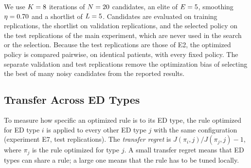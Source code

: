 We use $K=8$ iterations of $N=20$ candidates, an elite of $E=5$, smoothing $\eta=0.70$ and a shortlist of $L=5$. Candidates are evaluated on \NTrainReps{} training replications, the shortlist on \NValReps{} validation replications, and the selected policy on the \Reps{} test replications of the main experiment, which are never used in the search or the selection. Because the test replications are those of E2, the optimized policy is compared pairwise, on identical patients, with every fixed policy. The separate validation and test replications remove the optimization bias of selecting the best of many noisy candidates from the reported results.

\subsection{Transfer Across ED Types}

To measure how specific an optimized rule is to its ED type, the rule optimized for ED type $i$ is applied to every other ED type $j$ with the same configuration (experiment E7, \NTransferReps{} test replications). The \emph{transfer regret} is $J(\pi_i,j)/J(\pi_j,j)-1$, where $\pi_j$ is the rule optimized for type $j$. A small transfer regret means that ED types can share a rule; a large one means that the rule has to be tuned locally.
